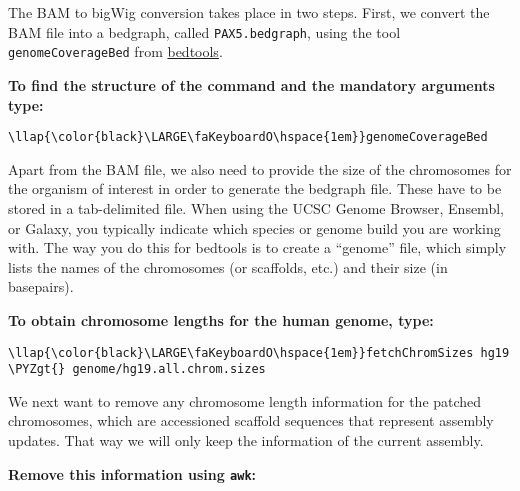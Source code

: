\documentclass[11pt]{article}
\def\PYZgt{\char`\>}
\begin{document}
The BAM to bigWig conversion takes place in two steps. First, we convert
the BAM file into a bedgraph, called \texttt{PAX5.bedgraph}, using the
tool \texttt{genomeCoverageBed} from
\href{https://bedtools.readthedocs.io/en/latest/}{bedtools}.

\textbf{To find the structure of the command and the mandatory arguments
type:}





\begin{terminalinput}
\begin{Verbatim}[commandchars=\\\{\}]
\llap{\color{black}\LARGE\faKeyboardO\hspace{1em}}genomeCoverageBed
\end{Verbatim}
\end{terminalinput}



    Apart from the BAM file, we also need to provide the size of the
chromosomes for the organism of interest in order to generate the
bedgraph file. These have to be stored in a tab-delimited file. When
using the UCSC Genome Browser, Ensembl, or Galaxy, you typically
indicate which species or genome build you are working with. The way you
do this for bedtools is to create a ``genome'' file, which simply lists
the names of the chromosomes (or scaffolds, etc.) and their size (in
basepairs).

\newpage

\textbf{To obtain chromosome lengths for the human genome, type:}





\begin{terminalinput}
\begin{Verbatim}[commandchars=\\\{\}]
\llap{\color{black}\LARGE\faKeyboardO\hspace{1em}}fetchChromSizes hg19 \PYZgt{} genome/hg19.all.chrom.sizes
\end{Verbatim}
\end{terminalinput}



    We next want to remove any chromosome length information for the patched
chromosomes, which are accessioned scaffold sequences that represent
assembly updates. That way we will only keep the information of the
current assembly.

\textbf{Remove this information using \texttt{awk}:}
\end{document}
